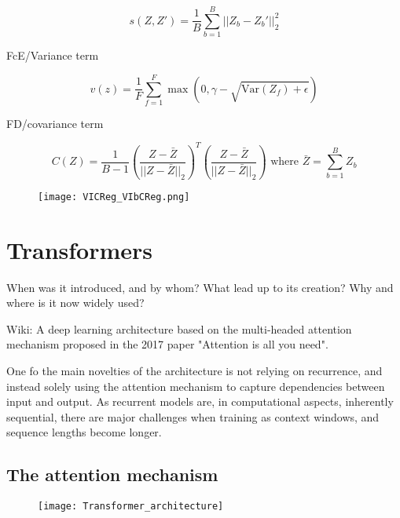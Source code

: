 \documentclass[../../thesis.tex]{subfiles}
\begin{document}
\begin{equation}
    s(Z,Z') = \frac{1}{B} \sum_{b=1}^B || Z_b-Z_b'||_2^2
\end{equation}

FcE/Variance term

\begin{equation}
    v(z) =  \frac{1}{F} \sum_{f=1}^F \max(0,\gamma - \sqrt{\text{Var}(Z_f)+\epsilon})
\end{equation}


FD/covariance term

\begin{equation}
    C(Z) = \frac{1}{B-1} \left(\frac{Z-\bar{Z}}{||Z-\bar{Z}||_2}\right)^T\left(\frac{Z-\bar{Z}}{||Z-\bar{Z}||_2}\right) \text{ where }  \bar{Z} = \sum_{b=1}^B  Z_b
\end{equation}

\begin{figure}[h]
    \texttt{[image: VICReg\_VIbCReg.png]}
    \centering    
    \caption{\cite{lee2024vibcreg}}
\end{figure}



\section{Transformers}

When was it introduced, and by whom?
What lead up to its creation?
Why and where is it now widely used? 


Wiki: A deep learning architecture based on the multi-headed attention mechanism proposed in the 2017 paper "Attention is all you need".

One fo the main novelties of the architecture is not relying on recurrence, and instead solely using the attention mechanism to capture dependencies between input and output. As recurrent models are, in computational aspects, inherently sequential, there are major challenges when training as context windows, and sequence lengths become longer. 



\subsection{The attention mechanism}


\begin{figure}[h]
    \texttt{[image: Transformer\_architecture]}
    \centering    
\end{figure}
\end{document}
